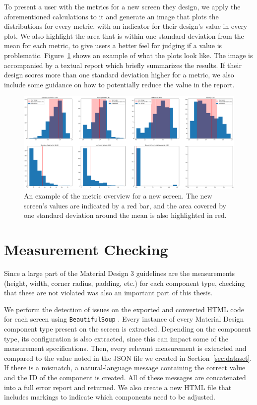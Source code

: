 \documentclass[11pt,titlepage,oneside,openany]{book}
\begin{document}
To present a user with the metrics for a new screen they design, we apply the aforementioned calculations to it and generate an image that plots the distributions for every metric, with an indicator for their design's value in every plot. We also highlight the area that is within one standard deviation from the mean for each metric, to give users a better feel for judging if a value is problematic. Figure~\ref{fig:stats_ana} shows an example of what the plots look like. The image is accompanied by a textual report which briefly summarizes the results. If their design scores more than one standard deviation higher for a metric, we also include some guidance on how to potentially reduce the value in the report.

\begin{figure}[H]
	\centering
	\includegraphics[width=\textwidth]{figures/adoption_1_analyzed.png}
	\caption{An example of the metric overview for a new screen. The new screen's values are indicated by a red bar, and the area covered by one standard deviation around the mean is also highlighted in red.}
	\label{fig:stats_ana}
\end{figure}

\section{Measurement Checking}\label{sec:concrete}
Since a large part of the Material Design 3 guidelines are the measurements (height, width, corner radius, padding, etc.) for each component type, checking that these are not violated was also an important part of this thesis.

We perform the detection of issues on the exported and converted HTML code for each screen using \texttt{BeautifulSoup} \cite{noauthor_beautiful_nodate-1}. Every instance of every Material Design component type present on the screen is extracted. Depending on the component type, its configuration is also extracted, since this can impact some of the measurement specifications. Then, every relevant measurement is extracted and compared to the value noted in the JSON file we created in Section~\ref{sec:dataset}. If there is a mismatch, a natural-language message containing the correct value and the ID of the component is created. All of these messages are concatenated into a full error report and returned. We also create a new HTML file that includes markings to indicate which components need to be adjusted.
\end{document}
